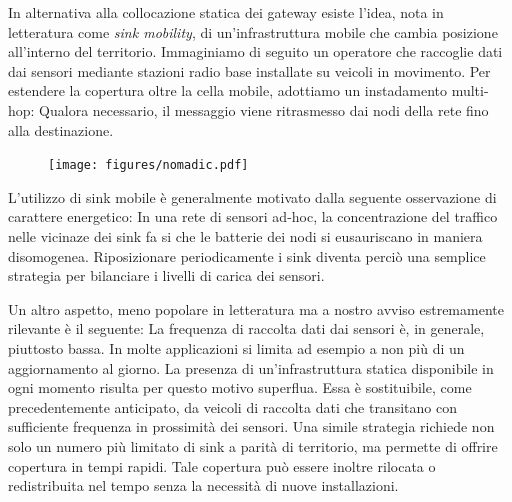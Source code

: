 \documentclass[a4paper,12pt]{article}
\theoremstyle{definition}
\begin{document}





In alternativa alla collocazione statica dei gateway esiste l'idea, nota in letteratura come \emph{sink mobility}, di un'infrastruttura mobile che cambia posizione all'interno del territorio. Immaginiamo di seguito un operatore che raccoglie dati dai sensori mediante stazioni radio base installate su veicoli in movimento. Per estendere la copertura oltre la cella mobile, adottiamo un instadamento multi-hop: Qualora necessario, il messaggio viene ritrasmesso dai nodi della rete fino alla destinazione.

\begin{figure}[H]
\centering
\texttt{[image: figures/nomadic.pdf]}
\caption{}
\end{figure}

L'utilizzo di sink mobile è generalmente motivato dalla seguente osservazione di carattere energetico: In una rete di sensori ad-hoc, la concentrazione del traffico nelle vicinaze dei sink fa si che le batterie dei nodi si eusauriscano in maniera disomogenea. Riposizionare periodicamente i sink diventa perciò una semplice strategia per bilanciare i livelli di carica dei sensori.

Un altro aspetto, meno popolare in letteratura ma a nostro avviso estremamente rilevante è il seguente: La frequenza di raccolta dati dai sensori è, in generale, piuttosto bassa. In molte applicazioni si limita ad esempio a non più di un aggiornamento al giorno. La presenza di un'infrastruttura statica disponibile in ogni momento risulta per questo motivo superflua. Essa è sostituibile, come precedentemente anticipato, da veicoli di raccolta dati che transitano con sufficiente frequenza in prossimità dei sensori. Una simile strategia richiede non solo un numero più limitato di sink a parità di territorio, ma permette di offrire copertura in tempi rapidi. Tale copertura può essere inoltre rilocata o redistribuita nel tempo senza la necessità di nuove installazioni.
\end{document}
